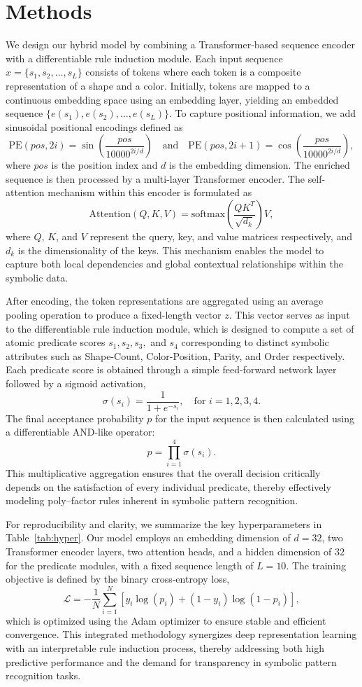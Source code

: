 \documentclass{article}
\begin{document}
\section{Methods}
We design our hybrid model by combining a Transformer‐based sequence encoder with a differentiable rule induction module. Each input sequence \( x = \{s_1, s_2, \ldots, s_L\} \) consists of tokens where each token is a composite representation of a shape and a color. Initially, tokens are mapped to a continuous embedding space using an embedding layer, yielding an embedded sequence \(\{e(s_1), e(s_2), \ldots, e(s_L)\}\). To capture positional information, we add sinusoidal positional encodings defined as 
\[
\text{PE}(pos, 2i) = \sin\left(\frac{pos}{10000^{2i/d}}\right) \quad \text{and} \quad \text{PE}(pos, 2i+1) = \cos\left(\frac{pos}{10000^{2i/d}}\right),
\]
where \( pos \) is the position index and \( d \) is the embedding dimension. The enriched sequence is then processed by a multi-layer Transformer encoder. The self-attention mechanism within this encoder is formulated as 
\[
\text{Attention}(Q, K, V) = \text{softmax}\!\left(\frac{QK^T}{\sqrt{d_k}}\right)V,
\]
where \( Q \), \( K \), and \( V \) represent the query, key, and value matrices respectively, and \( d_k \) is the dimensionality of the keys. This mechanism enables the model to capture both local dependencies and global contextual relationships within the symbolic data.

After encoding, the token representations are aggregated using an average pooling operation to produce a fixed-length vector \( z \). This vector serves as input to the differentiable rule induction module, which is designed to compute a set of atomic predicate scores \( s_1, s_2, s_3, \) and \( s_4 \) corresponding to distinct symbolic attributes such as Shape-Count, Color-Position, Parity, and Order respectively. Each predicate score is obtained through a simple feed-forward network layer followed by a sigmoid activation,
\[
\sigma(s_i) = \frac{1}{1 + e^{-s_i}}, \quad \text{for } i = 1,2,3,4.
\]
The final acceptance probability \( p \) for the input sequence is then calculated using a differentiable AND-like operator:
\[
p = \prod_{i=1}^{4} \sigma(s_i).
\]
This multiplicative aggregation ensures that the overall decision critically depends on the satisfaction of every individual predicate, thereby effectively modeling poly–factor rules inherent in symbolic pattern recognition.

For reproducibility and clarity, we summarize the key hyperparameters in Table~\ref{tab:hyper}. Our model employs an embedding dimension of \( d=32 \), two Transformer encoder layers, two attention heads, and a hidden dimension of \( 32 \) for the predicate modules, with a fixed sequence length of \( L=10 \). The training objective is defined by the binary cross-entropy loss,
\[
\mathcal{L} = -\frac{1}{N} \sum_{i=1}^{N} \left[ y_i \log(p_i) + (1-y_i) \log(1-p_i) \right],
\]
which is optimized using the Adam optimizer to ensure stable and efficient convergence. This integrated methodology synergizes deep representation learning with an interpretable rule induction process, thereby addressing both high predictive performance and the demand for transparency in symbolic pattern recognition tasks.
\end{document}
